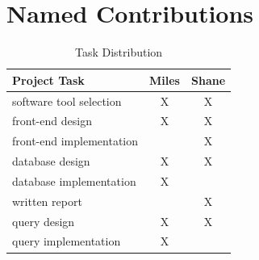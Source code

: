\documentclass[journal]{vgtc}
\begin{document}
\section{Named Contributions}
  \begin{table}[!h]
    \centering
    \caption{Task Distribution}
    \begin{tabular}{|l|cc|}
      \hline
      \textbf{Project Task}    & \textbf{Miles} & \textbf{Shane} \\ \hline
      software tool selection  & X              & X              \\
      front-end design         & X              & X              \\
      front-end implementation &                & X              \\
      database design          & X              & X              \\
      database implementation  & X              &                \\
      written report           &                & X              \\
      query design             & X              & X              \\
      query implementation     & X              &                \\ \hline
    \end{tabular}
  \end{table}
\end{document}
